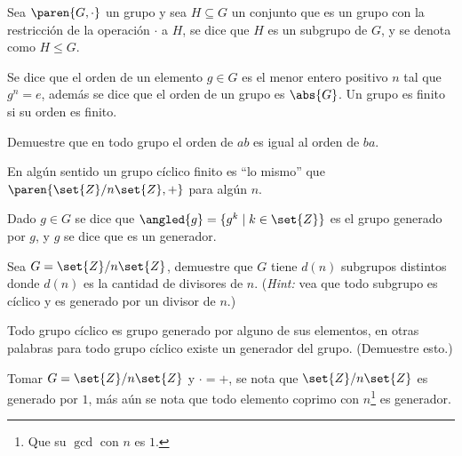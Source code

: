 \documentclass{ayudantia}
\begin{document}
\begin{defn}[Subgrupo]
    Sea \(\paren{G,\cdot}\) un grupo y sea \(H\subseteq G\) un conjunto que es un grupo con la restricción de la operación \(\cdot\) a \(H\), se dice que \(H\) es un subgrupo de \(G\), y se denota como \(H \leq G\).
\end{defn}
\begin{defn}[Orden]
    Se dice que el orden de un elemento \(g\in G\) es el menor entero positivo \(n\) tal que \(g^n=e\), además se dice que el orden de un grupo es \(\abs{G}\). Un grupo es finito si su orden es finito.
\end{defn}
\begin{prob}
    Demuestre que en todo grupo el orden de \(ab\) es igual al orden de \(ba\).
\end{prob}
\begin{remark}
    En algún sentido un grupo cíclico finito es ``lo mismo'' que \(\paren{\set{Z}/n\set{Z},+}\) para algún \(n\).
\end{remark}

\begin{defn}
    Dado \(g\in G\) se dice que \(\angled{g}=\{g^k\mid k\in\set{Z}\}\) es el grupo generado por \(g\), y \(g\) se dice que es un generador.
\end{defn}

\begin{prob}
    Sea \(G=\set{Z}/n\set{Z}\), demuestre que \(G\) tiene \(d(n)\) subgrupos distintos donde \(d(n)\) es la cantidad de divisores de \(n\). (\textit{Hint:} vea que todo subgrupo es cíclico y es generado por un divisor de \(n\).) 
\end{prob}

\begin{remark}
    Todo grupo cíclico es grupo generado por alguno de sus elementos, en otras palabras para todo grupo cíclico existe un generador del grupo. (Demuestre esto.)
\end{remark}

\begin{ejm}
    Tomar \(G=\set{Z}/n\set{Z}\) y \(\cdot=+\), se nota que \(\set{Z}/n\set{Z}\) es generado por \(1\), más aún se nota que todo elemento coprimo con \(n\)\footnote{Que su \(\gcd\) con \(n\) es \(1\).} es generador.
\end{ejm}
\end{document}
